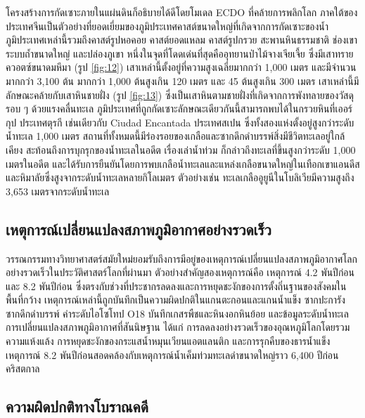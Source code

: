 \documentclass[10pt,twocolumn,letterpaper]{article}
\begin{document}
โครงสร้างการกัดเซาะภายในแผ่นดินก็อธิบายได้ดีโดยโมเดล ECDO ที่คล้ายการพลิกโลก ภาคใต้ของประเทศจีนเป็นตัวอย่างที่ยอดเยี่ยมของภูมิประเทศคาสต์ขนาดใหญ่ที่เกิดจากการกัดเซาะของน้ำ \cite{82} ภูมิประเทศเหล่านี้รวมถึงคาสต์รูปหอคอย คาสต์ยอดแหลม คาสต์รูปกรวย สะพานหินธรรมชาติ ช่องเขา ระบบถ้ำขนาดใหญ่ และปล่องภูเขา หนึ่งในจุดที่โดดเด่นที่สุดคืออุทยานป่าไม้จางเจียเจี้ย ซึ่งมีเสาทรายควอตซ์ขนาดมหึมา (รูป \ref{fig:12}) \cite{84} เสาเหล่านี้ตั้งอยู่ที่ความสูงเฉลี่ยมากกว่า 1,000 เมตร และมีจำนวนมากกว่า 3,100 ต้น มากกว่า 1,000 ต้นสูงเกิน 120 เมตร และ 45 ต้นสูงเกิน 300 เมตร \cite{85} เสาเหล่านี้มีลักษณะคล้ายกับเสาหินชายฝั่ง (รูป \ref{fig:13}) ซึ่งเป็นเสาหินตามชายฝั่งที่เกิดจากการพังทลายของวัสดุรอบ ๆ ด้วยแรงคลื่นทะเล ภูมิประเทศที่ถูกกัดเซาะลักษณะเดียวกันนี้สามารถพบได้ในกรวยหินที่เออร์กุป ประเทศตุรกี เช่นเดียวกับ Ciudad Encantada ประเทศสเปน ซึ่งทั้งสองแห่งตั้งอยู่สูงกว่าระดับน้ำทะเล 1,000 เมตร สถานที่ทั้งหมดนี้มีร่องรอยของเกลือและซากดึกดำบรรพ์สิ่งมีชีวิตทะเลอยู่ใกล้เคียง สะท้อนถึงการบุกรุกของน้ำทะเลในอดีต \cite{15,86,87} เรื่องเล่าน้ำท่วม \cite{3} ก็กล่าวถึงทะเลที่ขึ้นสูงกว่าระดับ 1,000 เมตรในอดีต และได้รับการยืนยันโดยการพบเกลือน้ำทะเลและแหล่งเกลือขนาดใหญ่ในเทือกเขาแอนดีสและหิมาลัยซึ่งสูงจากระดับน้ำทะเลหลายกิโลเมตร ตัวอย่างเช่น ทะเลเกลืออูยูนีในโบลิเวียมีความสูงถึง 3,653 เมตรจากระดับน้ำทะเล \cite{94}

\subsection{เหตุการณ์เปลี่ยนแปลงสภาพภูมิอากาศอย่างรวดเร็ว}

วรรณกรรมทางวิทยาศาสตร์สมัยใหม่ยอมรับถึงการมีอยู่ของเหตุการณ์เปลี่ยนแปลงสภาพภูมิอากาศโลกอย่างรวดเร็วในประวัติศาสตร์โลกที่ผ่านมา ตัวอย่างสำคัญสองเหตุการณ์คือ เหตุการณ์ 4.2 พันปีก่อน และ 8.2 พันปีก่อน ซึ่งตรงกับช่วงที่ประชากรลดลงและการหยุดชะงักของการตั้งถิ่นฐานของสังคมในพื้นที่กว้าง เหตุการณ์เหล่านี้ถูกบันทึกเป็นความผิดปกติในแกนตะกอนและแกนน้ำแข็ง ซากปะการังซากดึกดำบรรพ์ ค่าระดับไอโซโทป O18 บันทึกเกสรพืชและหินงอกหินย้อย และข้อมูลระดับน้ำทะเล การเปลี่ยนแปลงสภาพภูมิอากาศที่สันนิษฐาน ได้แก่ การลดลงอย่างรวดเร็วของอุณหภูมิโลกโดยรวม ความแห้งแล้ง การหยุดชะงักของกระแสน้ำหมุนเวียนแอตแลนติก และการรุกคืบของธารน้ำแข็ง \cite{90,91,92} เหตุการณ์ 8.2 พันปีก่อนสอดคล้องกับเหตุการณ์น้ำเค็มท่วมทะเลดำขนาดใหญ่ราว 6,400 ปีก่อนคริสตกาล \cite{93}

\subsection{ความผิดปกติทางโบราณคดี}
\end{document}
